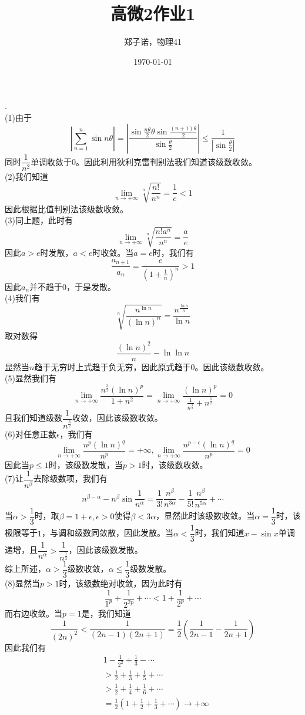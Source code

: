 \documentclass[utf8]{ctexart}
\title{高微2作业1}
\author{郑子诺，物理41}
\date{\today}
\begin{document}
\maketitle
{}.\\
(1)由于
\[|\sum_{n=1}^n\sin n\theta|=|\frac{\sin\frac{n\theta}{2}\theta\sin\frac{(n+1)\theta}{2}}{\sin\frac{\theta}{2}}|\le\frac{1}{|\sin\frac{\theta}{2}|}\]
同时$\dfrac{1}{n^2}$单调收敛于$0$。因此利用狄利克雷判别法我们知道该级数收敛。\\
(2)我们知道
\[\lim_{n\rightarrow+\infty}\sqrt[n]{\frac{n!}{n^n}}=\frac{1}{e}<1\]
因此根据比值判别法该级数收敛。\\
(3)同上题，此时有
\[\lim_{n\rightarrow+\infty}\sqrt[n]{\frac{n!a^n}{n^n}}=\frac{a}{e}\]
因此$a>e$时发散，$a<e$时收敛。当$a=e$时，我们有
\[\frac{a_{n+1}}{a_n}=\frac{e}{(1+\frac{1}{n})^n}>1\]
因此$a_n$并不趋于$0$，于是发散。\\
(4)我们有
\[\sqrt[n]{\frac{n^{\ln n}}{(\ln n)^n}}=\frac{n^{\frac{\ln n}{n}}}{\ln n}\]
取对数得
\[\frac{(\ln n)^2}{n}-\ln\ln n\]
显然当$n$趋于无穷时上式趋于负无穷，因此原式趋于$0$。因此该级数收敛。\\
(5)显然我们有
\[\lim_{n\rightarrow+\infty}\frac{n^{\frac{3}{2}}(\ln n)^p}{1+n^2}=\lim_{n\rightarrow+\infty}\frac{(\ln n)^p}{\frac{1}{n^\frac{3}{2}}+n^\frac{1}{2}}=0\]
且我们知道级数$\dfrac{1}{n^\frac{3}{2}}$收敛，因此该级数收敛。\\
(6)对任意正数$\epsilon$，我们有
\[\lim_{n\rightarrow+\infty}\frac{n^p(\ln n)^q}{n^p}=+\infty,\lim_{n\rightarrow+\infty}\frac{n^{p-\epsilon}(\ln n)^q}{n^p}=0\]
因此当$p\le1$时，该级数发散，当$p>1$时，该级数收敛。\\
(7)让$\dfrac{1}{n^\beta}$去除级数项，我们有
\[n^{\beta-\alpha}-n^\beta\sin\frac{1}{n^\alpha}=\frac{1}{3!}\frac{n^\beta}{n^{3\alpha}}-\frac{1}{5!}\frac{n^\beta}{n^{5\alpha}}+\cdots\]
当$\alpha>\dfrac{1}{3}$时，取$\beta=1+\epsilon,\epsilon>0$使得$\beta<3\alpha$，显然此时该级数收敛。当$\alpha=\dfrac{1}{3}$时，该极限等于$1$，与调和级数同敛散，因此发散。当$\alpha
<\dfrac{1}{3}$时，我们知道$x-\sin x$单调递增，且$\dfrac{1}{n^\alpha}>\dfrac{1}{n^\frac{1}{3}}$，因此该级数发散。\\
综上所述，$\alpha>\dfrac{1}{3}$级数收敛，$\alpha\le\dfrac{1}{3}$级数发散。\\
(8)显然当$p>1$时，该级数绝对收敛，因为此时有
\[\frac{1}{1^p}+\frac{1}{2^{2p}}+\cdots<1+\frac{1}{2^p}+\cdots\]
而右边收敛。当$p=1$是，我们知道
\[\frac{1}{(2n)^2}<\frac{1}{(2n-1)(2n+1)}=\frac{1}{2}(\frac{1}{2n-1}-\frac{1}{2n+1})\]
因此我们有
\begin{align*}
	&1-\frac{1}{2^2}+\frac{1}{3}-\cdots\\
	&>\frac{1}{2}+\frac{1}{3}+\frac{1}{5}+\cdots\\
	&>\frac{1}{2}+\frac{1}{4}+\frac{1}{6}+\cdots\\
	&=\frac{1}{2}(1+\frac{1}{2}+\frac{1}{3}+\cdots)\rightarrow+\infty
\end{align*}
\end{document}
